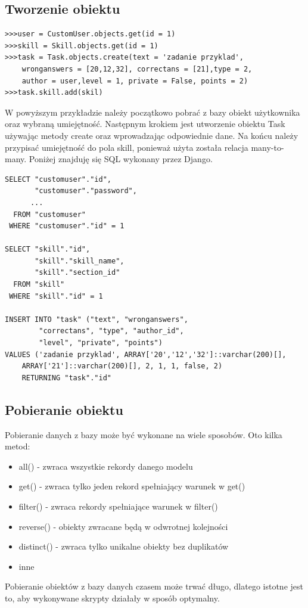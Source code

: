 \documentclass[oneside,polski,logo,indent]{amuthesis}
\begin{document}
\begin{enumerate}
\begin{enumerate}
\subsection{Tworzenie obiektu}
\begin{lstlisting}[style=DOS]
>>>user = CustomUser.objects.get(id = 1)
>>>skill = Skill.objects.get(id = 1)
>>>task = Task.objects.create(text = 'zadanie przyklad',
	wronganswers = [20,12,32], correctans = [21],type = 2,
	author = user,level = 1, private = False, points = 2)
>>>task.skill.add(skil)

\end{lstlisting}
W powyższym przykładzie należy początkowo pobrać z bazy obiekt użytkownika oraz wybraną umiejętność. Następnym krokiem jest utworzenie obiektu Task używając metody create oraz wprowadzając odpowiednie dane. Na końcu należy przypisać umiejętność do pola skill, ponieważ użyta została relacja many-to-many. Poniżej znajduję się SQL wykonany przez Django.
\begin{lstlisting}[style=DOS]
SELECT "customuser"."id",
       "customuser"."password",
	  ...
  FROM "customuser"
 WHERE "customuser"."id" = 1

SELECT "skill"."id",
       "skill"."skill_name",
       "skill"."section_id"
  FROM "skill"
 WHERE "skill"."id" = 1

INSERT INTO "task" ("text", "wronganswers",
		"correctans", "type", "author_id",
		"level", "private", "points")
VALUES ('zadanie przyklad', ARRAY['20','12','32']::varchar(200)[],
	ARRAY['21']::varchar(200)[], 2, 1, 1, false, 2) 
	RETURNING "task"."id"
\end{lstlisting}
\subsection{Pobieranie obiektu}
Pobieranie danych z bazy może być wykonane na wiele sposobów. Oto kilka metod:
\begin{itemize}
\item all() - zwraca wszystkie rekordy danego modelu
\item get() - zwraca tylko jeden rekord spełniający warunek w get()
\item filter() - zwraca rekordy spełniające warunek w filter()
\item reverse() - obiekty zwracane będą w odwrotnej kolejności
\item distinct() - zwraca tylko unikalne obiekty bez duplikatów
\item inne
\end{itemize}
Pobieranie obiektów z bazy danych czasem może trwać długo, dlatego istotne jest to, aby wykonywane skrypty działały w sposób optymalny. 


\end{enumerate}
\end{enumerate}
\end{document}
